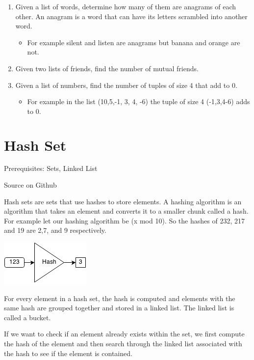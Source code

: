\documentclass[11pt,oneside]{book}
\makeatletter
\def\maxwidth#1{\ifdim\Gin@nat@width>#1 #1\else\Gin@nat@width\fi}
\makeatother
\begin{document}
\begin{enumerate}
\item Given a list of words, determine how many of them are anagrams of each other. An anagram is a word that can have its letters scrambled into another word. 

\begin{itemize}
\item For example silent and listen are anagrams but banana and orange are not.
\end{itemize}
\item Given two lists of friends, find the number of mutual friends.
\item Given a list of numbers, find the number of tuples of size 4 that add to 0. 

\begin{itemize}
\item For example in the list (10,5,-1, 3, 4, -6) the tuple of size 4 (-1,3,4-6) adds to 0.
\end{itemize}
\end{enumerate}

        \section{ Hash Set }
        

Prerequisites: Sets, Linked List

Source on Github

Hash sets are sets that use hashes to store elements. A hashing algorithm is an algorithm that takes an element and converts it to a smaller chunk called a hash. For example let our hashing algorithm be (x mod 10). So the hashes of 232, 217 and 19 are 2,7, and 9 respectively.

\vspace{5px}\includegraphics[width=\maxwidth{\textwidth}]{hashcode.png}

For every element in a hash set, the hash is computed and elements with the same hash are grouped together and stored in a linked list. The linked list is called a bucket.

If we want to check if an element already exists within the set, we first compute the hash of the element and then search through the linked list associated with the hash to see if the element is contained.
\end{document}
